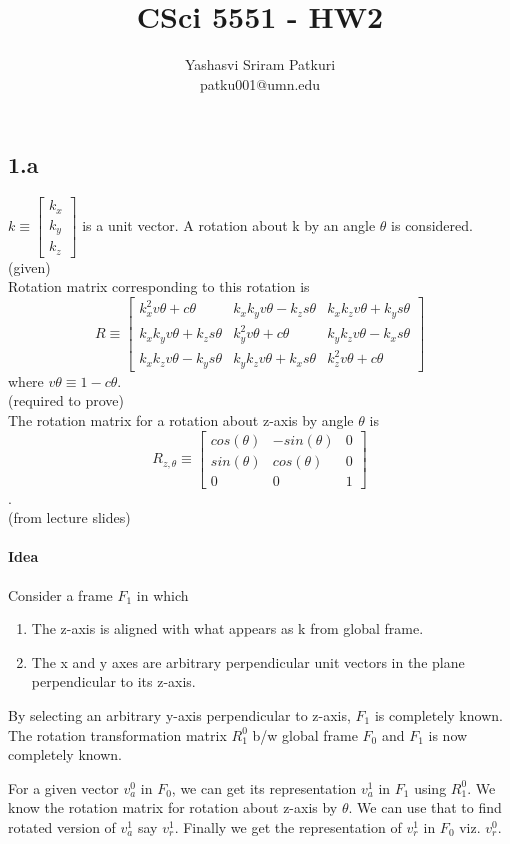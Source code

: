 \documentclass[12pt]{article}
\title{CSci 5551 - HW2}
\author{Yashasvi Sriram Patkuri\\patku001@umn.edu}
\newcommand{\fromlectures}{{\\ \color{blue} \hspace*{\fill}(from lecture slides)} \\}
\newcommand{\given}{{\\ \color{blue} \hspace*{\fill}(given)} \\}
\newcommand{\rtp}{{\\ \color{blue} \hspace*{\fill}(required to prove)} \\}
\newcommand{\rz}[1]{\begin{bmatrix} cos(#1) & -sin(#1) & 0 \\ sin(#1) & cos(#1) & 0 \\ 0 & 0 & 1 \end{bmatrix}}
\begin{document}
\maketitle
\pagebreak

\section{}
\subsection*{1.a}
$ k \equiv \begin{bmatrix} k_x \\ k_y \\ k_z \end{bmatrix} $ is a unit vector.
A rotation about k by an angle $\theta$ is considered.
\given

Rotation matrix corresponding to this rotation is
\[
  R \equiv
  \begin{bmatrix}
    k_x^2v\theta + c\theta & k_xk_yv\theta - k_zs\theta & k_xk_zv\theta + k_ys\theta\\
    k_xk_yv\theta + k_zs\theta & k_y^2v\theta + c\theta & k_yk_zv\theta - k_xs\theta \\
    k_xk_zv\theta - k_ys\theta & k_yk_zv\theta + k_xs\theta & k_z^2v\theta + c\theta
  \end{bmatrix}
\]
where $v\theta \equiv 1 - c\theta$.
\rtp

The rotation matrix for a rotation about z-axis by angle $\theta$ is
\[
  R_{z,\theta} \equiv \rz{\theta}
\].
\fromlectures

\paragraph{Idea}
Consider a frame $ F_1 $ in which
\begin{enumerate}[nolistsep]
  \item The z-axis is aligned with what appears as k from global frame.
  \item The x and y axes are arbitrary perpendicular unit vectors in the plane perpendicular to its z-axis.
\end{enumerate}
By selecting an arbitrary y-axis perpendicular to z-axis, $ F_1 $ is completely known.
The rotation transformation matrix $ R_1^0 $ b/w global frame $ F_0 $ and $ F_1 $ is now completely known.

For a given vector $ v^0_a $ in $ F_0 $, we can get its representation $ v^1_a $ in $ F_1 $ using $ R_1^0 $.
We know the rotation matrix for rotation about z-axis by $\theta$.
We can use that to find rotated version of $ v^1_a $ say $ v^1_r $.
Finally we get the representation of $ v^1_r $ in $ F_0 $ viz. $ v^0_r $.
\end{document}
